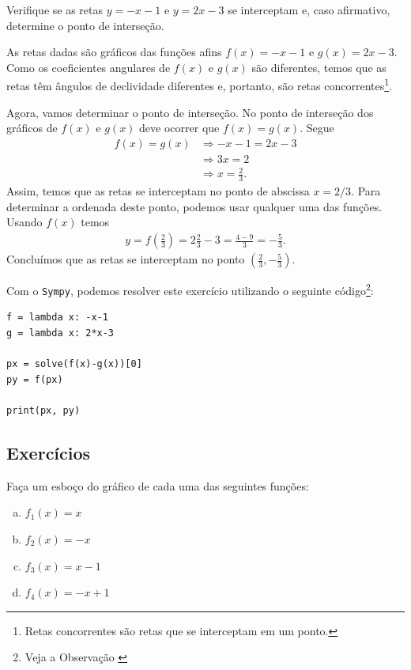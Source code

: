 \begin{exeresol}
  Verifique se as retas $y = -x - 1$ e $y = 2x - 3$ se interceptam e, caso afirmativo, determine o ponto de interseção.
\end{exeresol}
\begin{resol}
  As retas dadas são gráficos das funções afins $f(x) = -x - 1$ e $g(x) = 2x - 3$. Como os coeficientes angulares de $f(x)$ e $g(x)$ são diferentes, temos que as retas têm ângulos de declividade diferentes e, portanto, são retas concorrentes\footnote{Retas concorrentes são retas que se interceptam em um ponto.}.

  Agora, vamos determinar o ponto de interseção. No ponto de interseção dos gráficos de $f(x)$ e $g(x)$ deve ocorrer que $f(x) = g(x)$. Segue
  \begin{align}
    f(x)=g(x) &\Rightarrow -x-1 = 2x-3\\
              &\Rightarrow 3x = 2\\
              &\Rightarrow x = \frac{2}{3}.
  \end{align}
  Assim, temos que as retas se interceptam no ponto de abscissa $x = 2/3$. Para determinar a ordenada deste ponto, podemos usar qualquer uma das funções. Usando $f(x)$ temos
  \begin{align}
    y = f\left(\frac{2}{3}\right) = 2\frac{2}{3} - 3 = \frac{4 - 9}{3} = -\frac{5}{3}.
  \end{align}
  Concluímos que as retas se interceptam no ponto $(\frac{2}{3}, -\frac{5}{3})$.

    \ifispython
    Com o \verb+Sympy+, podemos resolver este exercício utilizando o seguinte código\footnote{Veja a Observação \label{obs:cap_funafom_python}}:
\begin{verbatim}
f = lambda x: -x-1
g = lambda x: 2*x-3

px = solve(f(x)-g(x))[0]
py = f(px)

print(px, py)
\end{verbatim}
  \fi
\end{resol}

\subsection*{Exercícios}

\begin{ex}
  Faça um esboço do gráfico de cada uma das seguintes funções:
  \begin{enumerate}[a)]
  \item $f_1(x) = x$
  \item $f_2(x) = -x$
  \item $f_3(x) = x-1$
  \item $f_4(x) = -x+1$
  \end{enumerate}
\end{ex}

